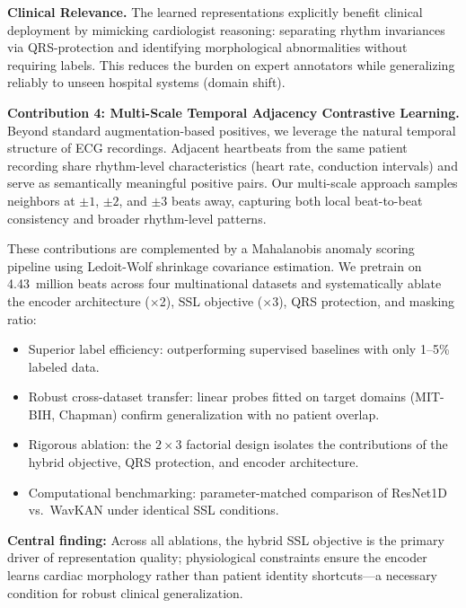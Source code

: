 \documentclass[journal,10pt]{IEEEtran}
\begin{document}
\vspace{0.5em}
\noindent\textbf{Clinical Relevance.} The learned representations explicitly benefit clinical deployment by mimicking cardiologist reasoning: separating rhythm invariances via QRS-protection and identifying morphological abnormalities without requiring labels. This reduces the burden on expert annotators while generalizing reliably to unseen hospital systems (domain shift).

\vspace{0.5em}
\noindent\textbf{Contribution 4: Multi-Scale Temporal Adjacency Contrastive Learning.} Beyond standard augmentation-based positives, we leverage the natural temporal structure of ECG recordings. Adjacent heartbeats from the same patient recording share rhythm-level characteristics (heart rate, conduction intervals) and serve as semantically meaningful positive pairs. Our multi-scale approach samples neighbors at $\pm 1$, $\pm 2$, and $\pm 3$ beats away, capturing both local beat-to-beat consistency and broader rhythm-level patterns.

These contributions are complemented by a Mahalanobis anomaly scoring pipeline using Ledoit-Wolf shrinkage covariance estimation. We pretrain on 4.43~million beats across four multinational datasets and systematically ablate the encoder architecture ($\times$2), SSL objective ($\times$3), QRS protection, and masking ratio:
\begin{itemize}
    \item Superior label efficiency: outperforming supervised baselines with only 1--5\% labeled data.
    \item Robust cross-dataset transfer: linear probes fitted on target domains (MIT-BIH, Chapman) confirm generalization with no patient overlap.
    \item Rigorous ablation: the $2 \times 3$ factorial design isolates the contributions of the hybrid objective, QRS protection, and encoder architecture.
    \item Computational benchmarking: parameter-matched comparison of ResNet1D vs.\ WavKAN under identical SSL conditions.
\end{itemize}

\noindent\textbf{Central finding:} Across all ablations, the hybrid SSL objective is the primary driver of representation quality; physiological constraints ensure the encoder learns cardiac morphology rather than patient identity shortcuts—a necessary condition for robust clinical generalization.
\end{document}
